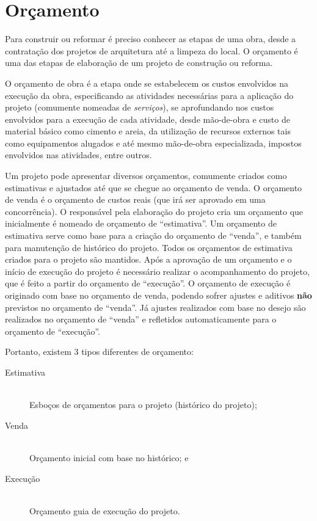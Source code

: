 \chapter{Orçamento}

Para construir ou reformar é preciso conhecer as etapas de uma obra, desde a contratação dos projetos de arquitetura até a limpeza do local. O orçamento é uma das etapas de elaboração de um projeto de construção ou reforma.

O orçamento de obra é a etapa onde se estabelecem os custos envolvidos na execução da obra, especificando as atividades necessárias para a aplicação do projeto (comumente nomeadas de \emph{serviços}), se aprofundando nos custos envolvidos para a execução de cada atividade, desde mão-de-obra e custo de material básico como cimento e areia, da utilização de recursos externos tais como equipamentos alugados e até mesmo mão-de-obra especializada, impostos envolvidos nas atividades, entre outros.

Um projeto pode apresentar diversos orçamentos, comumente criados como estimativas e ajustados até que se chegue ao orçamento de venda. O orçamento de venda é o orçamento de custos reais (que irá ser aprovado em uma concorrência).
O responsável pela elaboração do projeto cria um orçamento que inicialmente é nomeado de orçamento de ``estimativa''. Um orçamento de estimativa serve como base para a criação do orçamento de ``venda'', e também para manutenção de histórico do projeto. Todos os orçamentos de estimativa criados para o projeto são mantidos. Após a aprovação de um orçamento e o início de execução do projeto é necessário realizar o acompanhamento do projeto, que é feito a partir do orçamento de ``execução''. O orçamento de execução é originado com base no orçamento de venda, podendo sofrer ajustes e aditivos \textbf{não} previstos no orçamento de ``venda''. Já ajustes realizados com base no desejo são realizados no orçamento de ``venda'' e refletidos automaticamente para o orçamento de ``execução''.

Portanto, existem 3 tipos diferentes de orçamento:

\begin{description}
	\item[Estimativa] \hfill \\
	Esboços de orçamentos para o projeto (histórico do projeto);
	\item[Venda] \hfill \\
	Orçamento inicial com base no histórico; e
	\item[Execução] \hfill \\
	Orçamento guia de execução do projeto.
\end{description}


